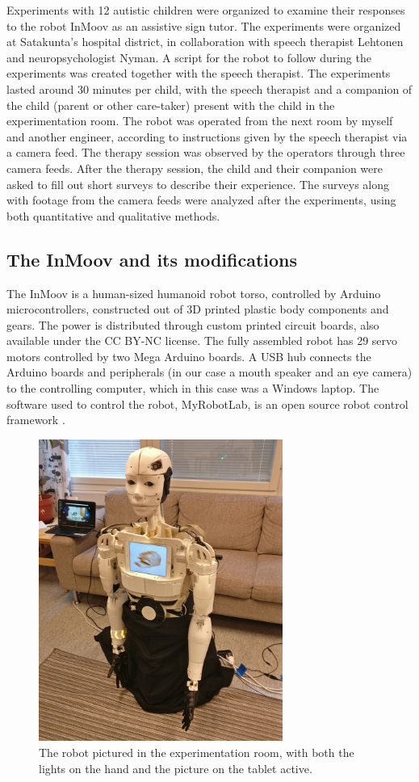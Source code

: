 Experiments with 12 autistic children were organized to examine their responses to the robot InMoov as an assistive sign tutor. The experiments were organized at Satakunta's hospital district, in collaboration with speech therapist Lehtonen and neuropsychologist Nyman. A script for the robot to follow during the experiments was created together with the speech therapist. The experiments lasted around 30 minutes per child, with the speech therapist and a companion of the child (parent or other care-taker) present with the child in the experimentation room. The robot was operated from the next room by myself and another engineer, according to instructions given by the speech therapist via a camera feed. The therapy session was observed by the operators through three camera feeds. After the therapy session, the child and their companion were asked to fill out short surveys to describe their experience. The surveys along with footage from the camera feeds were analyzed after the experiments, using both quantitative and qualitative methods.


\subsection{The InMoov and its modifications}

The InMoov is a human-sized humanoid robot torso, controlled by Arduino microcontrollers, constructed out of 3D printed plastic body components and gears. The power is distributed through custom printed circuit boards, also available under the CC BY-NC license. The fully assembled robot has 29 servo motors controlled by two Mega Arduino boards. A USB hub connects the Arduino boards and peripherals (in our case a mouth speaker and an eye camera) to the controlling computer, which in this case was a Windows laptop. The software used to control the robot, MyRobotLab, is an open source robot control framework \cite{inmoov}. 

\begin{figure}
\centering
  \includegraphics[width=8cm]{images/momo_on_floor.jpg}
  \caption{The robot pictured in the experimentation room, with both the lights on the hand and the picture on the tablet active.}
  \label{fig:momo}
\end{figure}

